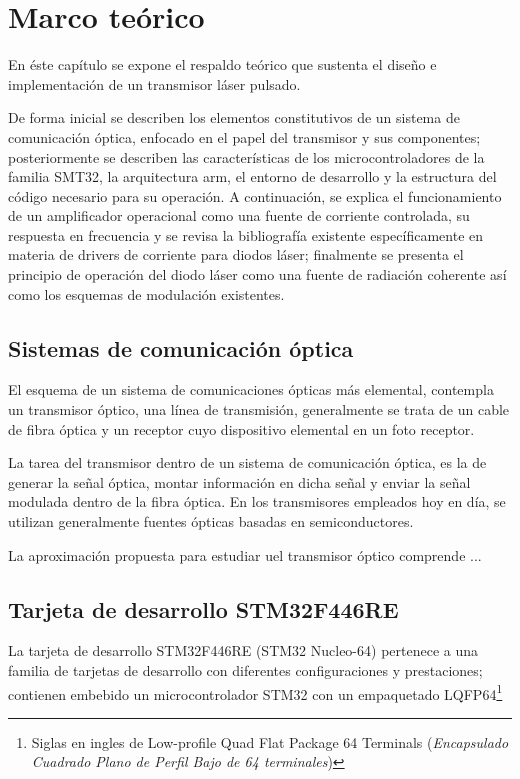 

\chapter{Marco teórico}

En éste capítulo se expone el respaldo teórico que sustenta el diseño e implementación de un transmisor láser pulsado.

De forma inicial se describen los elementos constitutivos de un sistema de comunicación óptica, enfocado en el papel del transmisor y sus componentes; posteriormente se describen las características de los microcontroladores de la familia SMT32, la arquitectura arm, el entorno de desarrollo y la estructura del código necesario para su operación. A continuación, se explica el funcionamiento de un amplificador operacional como una fuente de corriente controlada, su respuesta en frecuencia y se revisa la bibliografía existente específicamente en materia de drivers de corriente para diodos láser; finalmente se presenta el principio de operación del diodo láser como una fuente de radiación coherente así como los esquemas de modulación existentes.
\section{Sistemas de comunicación óptica}

El esquema de un sistema de comunicaciones ópticas más elemental, contempla un transmisor óptico, una línea de transmisión, generalmente se trata de un cable de fibra óptica y un receptor cuyo dispositivo elemental en un foto receptor.

La tarea del transmisor dentro de un sistema de comunicación óptica, es la de generar la señal óptica, montar información en dicha señal y enviar la señal modulada dentro de la fibra óptica. En los transmisores empleados hoy en día, se utilizan generalmente fuentes ópticas basadas en semiconductores.

La aproximación propuesta para estudiar uel transmisor óptico comprende ...




\section{Tarjeta de desarrollo STM32F446RE}
La tarjeta de desarrollo STM32F446RE (STM32 Nucleo-64) pertenece a una familia de tarjetas de desarrollo con diferentes configuraciones y prestaciones; contienen embebido un microcontrolador STM32 con un empaquetado LQFP64\footnote{Siglas en ingles de Low-profile Quad Flat Package 64 Terminals (\textit{Encapsulado Cuadrado Plano de Perfil Bajo de 64 terminales})} 

